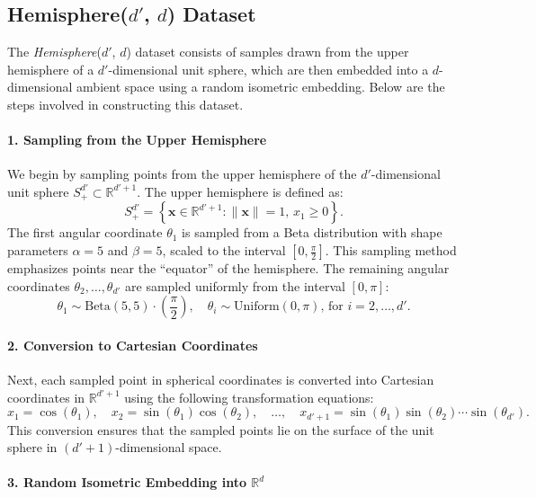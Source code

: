 \subsection{\texorpdfstring{Hemisphere($d'$, $d$)}{Hemisphere(d', d)} Dataset}

The \textit{Hemisphere}($d'$, $d$) dataset consists of samples drawn from the upper hemisphere of a $d'$-dimensional unit sphere, which are then embedded into a $d$-dimensional ambient space using a random isometric embedding. Below are the steps involved in constructing this dataset.

\paragraph{1. Sampling from the Upper Hemisphere}

We begin by sampling points from the upper hemisphere of the $d'$-dimensional unit sphere $S^{d'}_+ \subset \mathbb{R}^{d'+1}$. The upper hemisphere is defined as:
\[
S^{d'}_+ = \left\{ \mathbf{x} \in \mathbb{R}^{d'+1} : \|\mathbf{x}\| = 1, \, x_1 \geq 0 \right\}.
\]
The first angular coordinate $\theta_1$ is sampled from a Beta distribution with shape parameters $\alpha = 5$ and $\beta = 5$, scaled to the interval $\left[ 0, \frac{\pi}{2} \right]$. This sampling method emphasizes points near the ``equator'' of the hemisphere. The remaining angular coordinates $\theta_2, \ldots, \theta_{d'}$ are sampled uniformly from the interval $\left[ 0, \pi \right]$:
\[
\theta_1 \sim \text{Beta}(5, 5) \cdot \left( \frac{\pi}{2} \right), \quad \theta_i \sim \text{Uniform}(0, \pi), \, \text{for } i = 2, \ldots, d'.
\]

\paragraph{2. Conversion to Cartesian Coordinates}

Next, each sampled point in spherical coordinates is converted into Cartesian coordinates in $\mathbb{R}^{d'+1}$ using the following transformation equations:
\[
x_1 = \cos(\theta_1), \quad x_2 = \sin(\theta_1) \cos(\theta_2), \quad \dots, \quad x_{d'+1} = \sin(\theta_1) \sin(\theta_2) \cdots \sin(\theta_{d'}).
\]
This conversion ensures that the sampled points lie on the surface of the unit sphere in $(d'+1)$-dimensional space.

\paragraph{3. Random Isometric Embedding into $\mathbb{R}^d$}

